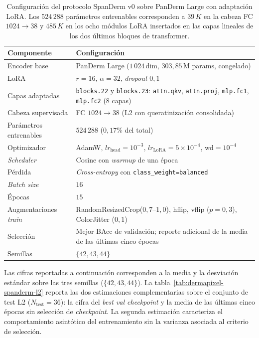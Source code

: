 \begin{table}[H]
\centering
\footnotesize
\setlength{\tabcolsep}{4pt}
\renewcommand{\arraystretch}{0.95}
\caption{Configuración del protocolo SpanDerm v0 sobre PanDerm
Large con adaptación LoRA. Los $524\,288$ parámetros
entrenables corresponden a $39\,K$ en la cabeza FC
$1024 \to 38$ y $485\,K$ en los ocho módulos LoRA insertados en
las capas lineales de los dos últimos bloques de transformer.}
\label{tab:dermapixel-spanderm-config}
\begin{tabular}{ll}
\hline
Componente                  & Configuración \\
\hline
Encoder base                & PanDerm Large ($1\,024$\,dim, $303{,}85$\,M params, congelado) \\
LoRA                        & $r=16$, $\alpha=32$, \emph{dropout} $0{,}1$ \\
Capas adaptadas             & \texttt{blocks.22} y \texttt{blocks.23}: \texttt{attn.qkv}, \texttt{attn.proj}, \texttt{mlp.fc1}, \texttt{mlp.fc2} (8 capas) \\
Cabeza supervisada          & FC $1024 \to 38$ (L2 con queratinización consolidada) \\
Parámetros entrenables      & $524\,288$ ($0{,}17\%$ del total) \\
Optimizador                 & AdamW, $lr_{\mathrm{head}} = 10^{-3}$, $lr_{\mathrm{LoRA}} = 5 \times 10^{-4}$, $\mathrm{wd} = 10^{-4}$ \\
\emph{Scheduler}            & Cosine con \emph{warmup} de una época \\
Pérdida                     & \emph{Cross-entropy} con \texttt{class\_weight=balanced} \\
\emph{Batch size}           & $16$ \\
Épocas                      & $15$ \\
Augmentaciones \emph{train} & RandomResizedCrop($0{,}7$--$1{,}0$), hflip, vflip ($p=0{,}3$), ColorJitter ($0{,}1$) \\
Selección                   & Mejor BAcc de validación; reporte adicional de la media de las últimas cinco épocas \\
Semillas                    & $\{42, 43, 44\}$ \\
\hline
\end{tabular}
\end{table}

Las cifras reportadas a continuación corresponden a la media y
la desviación estándar sobre las tres semillas
($\{42, 43, 44\}$). La tabla~\ref{tab:dermapixel-spanderm-l2}
reporta las dos estimaciones complementarias sobre el conjunto de
test L2 ($N_{\mathrm{test}} = 36$): la cifra del \emph{best val
checkpoint} y la media de las últimas cinco épocas sin selección
de \emph{checkpoint}. La segunda estimación caracteriza el
comportamiento asintótico del entrenamiento sin la varianza
asociada al criterio de selección.

